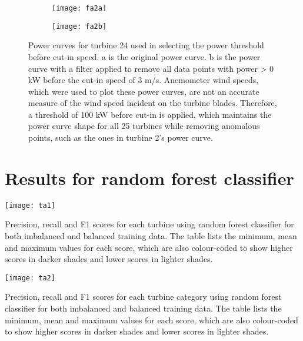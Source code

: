 \begin{figure}
    \centering
    \begin{subfigure}[t]{.5\textwidth}
        \centering
        \texttt{[image: fa2a]}
        \caption{}
    \end{subfigure}%
    \begin{subfigure}[t]{.5\textwidth}
        \centering
        \texttt{[image: fa2b]}
        \caption{}
    \end{subfigure}
    \captionsetup{labelformat=empty,list=no}
    \caption{Power curves for turbine 24 used in selecting the power threshold before cut-in speed. a is the original power curve. b is the power curve with a filter applied to remove all data points with power > 0 kW before the cut-in speed of 3 m/s. Anemometer wind speeds, which were used to plot these power curves, are not an accurate measure of the wind speed incident on the turbine blades. Therefore, a threshold of 100 kW before cut-in is applied, which maintains the power curve shape for all 25 turbines while removing anomalous points, such as the ones in turbine 2's power curve.}
\end{figure}

\chapter{Results for random forest classifier}\label{a3}

\begin{landscape}
    \begin{table}
        \centering
        \texttt{[image: ta1]}
        \captionsetup{labelformat=empty,list=no}
        \caption{Precision, recall and F1 scores for each turbine using random forest classifier for both imbalanced and balanced training data. The table lists the minimum, mean and maximum values for each score, which are also colour-coded to show higher scores in darker shades and lower scores in lighter shades.}
    \end{table}
\end{landscape}

\begin{table}
    \centering
    \texttt{[image: ta2]}
    \captionsetup{labelformat=empty,list=no}
    \caption{Precision, recall and F1 scores for each turbine category using random forest classifier for both imbalanced and balanced training data. The table lists the minimum, mean and maximum values for each score, which are also colour-coded to show higher scores in darker shades and lower scores in lighter shades.}
\end{table}

